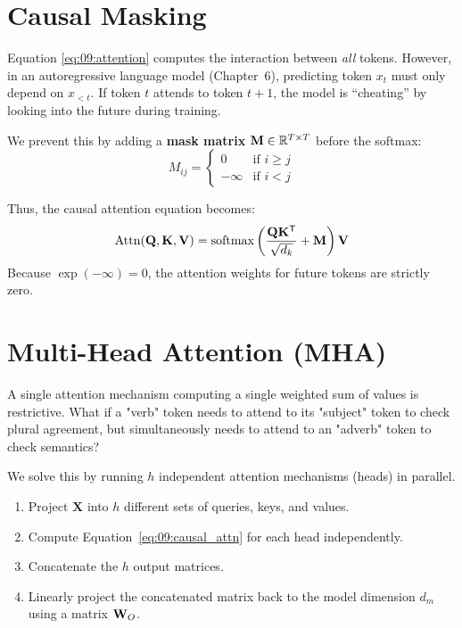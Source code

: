 \section{Causal Masking}

Equation \cref{eq:09:attention} computes the interaction between \emph{all} tokens. However, in an autoregressive language model (Chapter~6), predicting token $x_t$ must only depend on $x_{<t}$. If token $t$ attends to token $t+1$, the model is ``cheating'' by looking into the future during training.

We prevent this by adding a \textbf{mask matrix} $\mathbf{M} \in \mathbb{R}^{T \times T}$ before the softmax:
\begin{equation}
M_{ij} = \begin{cases} 
0 & \text{if } i \geq j \\
-\infty & \text{if } i < j 
\end{cases}
\end{equation}

Thus, the causal attention equation becomes:
\begin{equation}
\label{eq:09:causal_attn}
\operatorname{Attn}(\mathbf{Q}, \mathbf{K}, \mathbf{V}) = \operatorname{softmax}\left(\frac{\mathbf{Q} \mathbf{K}^{\mathsf{T}}}{\sqrt{d_k}} + \mathbf{M}\right) \mathbf{V}
\end{equation}
Because $\exp(-\infty) = 0$, the attention weights for future tokens are strictly zero.

\section{Multi-Head Attention (MHA)}

A single attention mechanism computing a single weighted sum of values is restrictive. What if a "verb" token needs to attend to its "subject" token to check plural agreement, but simultaneously needs to attend to an "adverb" token to check semantics? 

We solve this by running $h$ independent attention mechanisms (heads) in parallel.
\begin{enumerate}
    \item Project $\mathbf{X}$ into $h$ different sets of queries, keys, and values.
    \item Compute Equation~\cref{eq:09:causal_attn} for each head independently.
    \item Concatenate the $h$ output matrices.
    \item Linearly project the concatenated matrix back to the model dimension $d_m$ using a matrix $\mathbf{W}_O$.
\end{enumerate}

